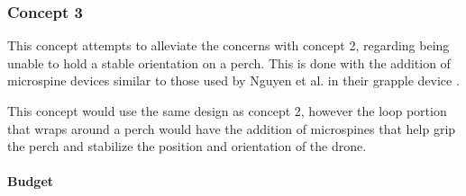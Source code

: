 \subsubsection{Concept 3} 

This concept attempts to alleviate the concerns with concept 2, regarding being unable to hold a
stable orientation on a perch. This is done with the addition of microspine devices similar to those used by
Nguyen et al. in their grapple device \cite{nguyen_passively_2019}. 

This concept would use the same design as concept 2, however the loop portion that wraps around a perch would
have the addition of microspines that help grip the perch and stabilize the position and orientation of the drone.


\paragraph{Budget}

